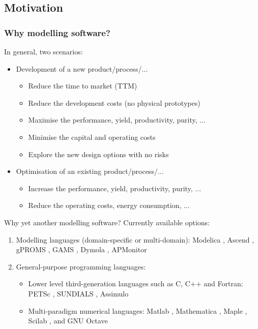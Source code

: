 \documentclass[compress,newPxFont,sthlmFooter]{beamer}
\newcommand{\skipcite}[1]{}
\begin{document}
\subsection{Motivation}

\begin{frame}
\frametitle{Why modelling software?}
In general, two scenarios:
\begin{itemize}
  \item \alert{Development} of a \alert{new} product/process/...
    \begin{itemize}
        \item Reduce the time to market (TTM)
        \item Reduce the development costs (no physical prototypes)
        \item Maximise the performance, yield, productivity, purity, ...
        \item Minimise the capital and operating costs
        \item Explore the new design options with no risks
    \end{itemize}

  \item \alert{Optimisation} of an \alert{existing} product/process/...
    \begin{itemize}
        \item Increase the performance, yield, productivity, purity, ...
        \item Reduce the operating costs, energy consumption, ...
    \end{itemize}
\end{itemize}
\end{frame}

\begin{frame}{Why \textcolor{sthlmRed}{yet another} modelling software?}
Currently available options:
\begin{enumerate}
   \item \alert{Modelling languages} (domain-specific or multi-domain): 
         Modelica \skipcite{Fritzson-and-Engelson-1998}, Ascend \skipcite{Piela-etal-1991}, gPROMS \skipcite{Barton-and-Pantelides-1994}, 
         GAMS \skipcite{Brook-etal-1988}, Dymola \skipcite{Elmqvist-1978}, APMonitor \skipcite{APMonitor-2014}
   \item \alert{General-purpose programming languages}:
      \begin{itemize}
          \item Lower level third-generation languages such as C, C++ and Fortran:
                PETSc \skipcite{petsc}, SUNDIALS \skipcite{Hindmarsh-etal-2005}, Assimulo \skipcite{Assimulo-2015}
          \item Multi-paradigm numerical languages: 
                Matlab \skipcite{matlab}, Mathematica \skipcite{mathematica}, Maple \skipcite{maple}, 
                Scilab \skipcite{scilab}, and GNU Octave \skipcite{octave}
      \end{itemize}
 \end{enumerate}
\end{frame}
\end{document}
